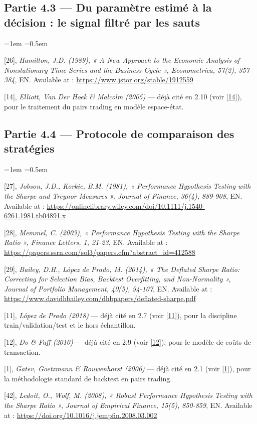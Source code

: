 \documentclass{article}
\begin{document}
\subsection*{Partie 4.3 --- Du paramètre estimé à la décision : le signal filtré par les sauts}
\begin{list}{}{\leftmargin=1em \itemsep=0.5em}
\item \hypertarget{ref26}{} [26], \textit{Hamilton, J.D. (1989), « A New Approach to the Economic Analysis of Nonstationary Time Series and the Business Cycle », Econometrica, 57(2), 357-384}, EN. Available at : \url{https://www.jstor.org/stable/1912559}
\item \hypertarget{ref14}{} [14], \textit{Elliott, Van Der Hoek \& Malcolm (2005)} --- déjà cité en 2.10 (voir \hyperlink{ref14}{[14]}), pour le traitement du pairs trading en modèle espace-état.
\end{list}
\subsection*{Partie 4.4 --- Protocole de comparaison des stratégies}
\begin{list}{}{\leftmargin=1em \itemsep=0.5em}
\item \hypertarget{ref27}{} [27], \textit{Jobson, J.D., Korkie, B.M. (1981), « Performance Hypothesis Testing with the Sharpe and Treynor Measures », Journal of Finance, 36(4), 889-908}, EN. Available at : \url{https://onlinelibrary.wiley.com/doi/10.1111/j.1540-6261.1981.tb04891.x}
\item \hypertarget{ref28}{} [28], \textit{Memmel, C. (2003), « Performance Hypothesis Testing with the Sharpe Ratio », Finance Letters, 1, 21-23}, EN. Available at : \url{https://papers.ssrn.com/sol3/papers.cfm?abstract_id=412588}
\item \hypertarget{ref29}{} [29], \textit{Bailey, D.H., López de Prado, M. (2014), « The Deflated Sharpe Ratio: Correcting for Selection Bias, Backtest Overfitting, and Non-Normality », Journal of Portfolio Management, 40(5), 94-107}, EN. Available at : \url{https://www.davidhbailey.com/dhbpapers/deflated-sharpe.pdf}
\item \hypertarget{ref11}{} [11], \textit{López de Prado (2018)} --- déjà cité en 2.7 (voir \hyperlink{ref11}{[11]}), pour la discipline train/validation/test et le hors échantillon.
\item \hypertarget{ref12}{} [12], \textit{Do \& Faff (2010)} --- déjà cité en 2.9 (voir \hyperlink{ref12}{[12]}), pour le modèle de coûts de transaction.
\item \hypertarget{ref1}{} [1], \textit{Gatev, Goetzmann \& Rouwenhorst (2006)} --- déjà cité en 2.1 (voir \hyperlink{ref1}{[1]}), pour la méthodologie standard de backtest en pairs trading.
\item \hypertarget{ref42}{} [42], \textit{Ledoit, O., Wolf, M. (2008), « Robust Performance Hypothesis Testing with the Sharpe Ratio », Journal of Empirical Finance, 15(5), 850-859}, EN. Available at : \url{https://doi.org/10.1016/j.jempfin.2008.03.002}
\end{list}
\end{document}
